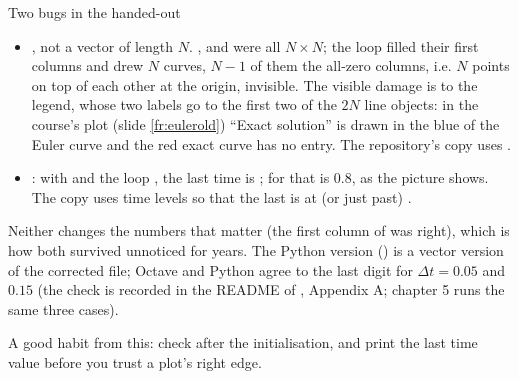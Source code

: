 \documentclass[aspectratio=169,11pt]{beamer}
\begin{document}
\begin{frame}{Two bugs in the handed-out }
\label{fr:stiffbugs}
\small
\begin{itemize}
  \item {}, not a vector of length $N$. ,  and  were all $N \times N$; the loop filled their first columns and  drew $N$ curves, $N - 1$ of them the all-zero columns, i.e. $N$ points on top of each other at the origin, invisible. The visible damage is to the legend, whose two labels go to the first two of the $2N$ line objects: in the course's plot (slide \ref{fr:eulerold}) ``Exact solution'' is drawn in the blue of the Euler curve and the red exact curve has no entry. The repository's copy uses .
  \item {}: with  and the loop , the last time is ; for  that is $0.8$, as the picture shows. The copy uses  time levels so that the last is at (or just past) .
\end{itemize}
Neither changes the numbers that matter (the first column of  was right), which is how both survived unnoticed for years. The Python version () is a vector version of the corrected file; Octave and Python agree to the last digit for $\Delta t = 0.05$ and $0.15$ (the check is recorded in the README of , Appendix A; chapter 5 runs the same three cases).
\begin{punchbox}
\small A good habit from this: check  after the initialisation, and print the last time value before you trust a plot's right edge.
\end{punchbox}
\end{frame}
\end{document}
